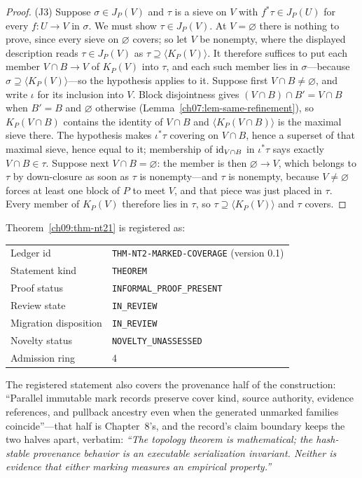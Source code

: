\begin{proof}
(J3) Suppose $\sigma\in J_{P}(V)$ and $\tau$ is a sieve on $V$ with $f^{*}\tau\in J_{P}(U)$ for every $f:U\to V$ in $\sigma$. We must show $\tau\in J_{P}(V)$. At $V=\varnothing$ there is nothing to prove, since every sieve on $\varnothing$ covers; so let $V$ be nonempty, where the displayed description reads $\tau\in J_{P}(V)$ as $\tau\supseteq\langle K_{P}(V)\rangle$. It therefore suffices to put each member $V\cap B\to V$ of $K_{P}(V)$ into $\tau$, and each such member lies in $\sigma$---because $\sigma\supseteq\langle K_{P}(V)\rangle$---so the hypothesis applies to it. Suppose first $V\cap B\neq\varnothing$, and write $\iota$ for its inclusion into $V$. Block disjointness gives $(V\cap B)\cap B'=V\cap B$ when $B'=B$ and $\varnothing$ otherwise (Lemma~\ref{ch07:lem-same-refinement}), so $K_{P}(V\cap B)$ contains the identity of $V\cap B$ and $\langle K_{P}(V\cap B)\rangle$ is the maximal sieve there. The hypothesis makes $\iota^{*}\tau$ covering on $V\cap B$, hence a superset of that maximal sieve, hence equal to it; membership of $\mathrm{id}_{V\cap B}$ in $\iota^{*}\tau$ says exactly $V\cap B\in\tau$. Suppose next $V\cap B=\varnothing$: the member is then $\varnothing\to V$, which belongs to $\tau$ by down-closure as soon as $\tau$ is nonempty---and $\tau$ is nonempty, because $V\neq\varnothing$ forces at least one block of $P$ to meet $V$, and that piece was just placed in $\tau$. Every member of $K_{P}(V)$ therefore lies in $\tau$, so $\tau\supseteq\langle K_{P}(V)\rangle$ and $\tau$ covers.
\end{proof}

\begin{remark}\label{ch09:rem-ledger-nt21}
Theorem~\ref{ch09:thm-nt21} is registered as:
\begin{center}
\begin{tabular}{@{}ll@{}}
\toprule
Ledger id & \texttt{THM-NT2-MARKED-COVERAGE} (version 0.1) \\
Statement kind & \texttt{THEOREM} \\
Proof status & \texttt{INFORMAL\_PROOF\_PRESENT} \\
Review state & \texttt{IN\_REVIEW} \\
Migration disposition & \texttt{IN\_REVIEW} \\
Novelty status & \texttt{NOVELTY\_UNASSESSED} \\
Admission ring & 4 \\
\bottomrule
\end{tabular}
\end{center}
The registered statement also covers the provenance half of the construction: ``Parallel immutable mark records preserve cover kind, source authority, evidence references, and pullback ancestry even when the generated unmarked families coincide''---that half is Chapter~8's, and the record's claim boundary keeps the two halves apart, verbatim: \emph{``The topology theorem is mathematical; the hash-stable provenance behavior is an executable serialization invariant. Neither is evidence that either marking measures an empirical property.''}
\end{remark}

